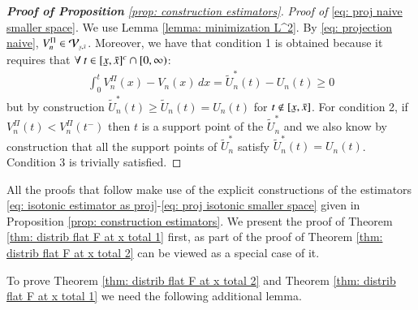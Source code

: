\begin{proof}[\hypertarget{proof of prop constructions}{\textbf{Proof of Proposition}} \ref{prop: construction estimators}]
    
    \textit{Proof of} \eqref{eq: proj naive smaller space}.  We use Lemma \ref{lemma: minimization L^2}. By \eqref{eq: projection naive}, $V^{\Pi}_n \in \mathcal{V}_{\scriptscriptstyle{\ubar{x},\bar{x}}}$. Moreover, we have that condition 1 is obtained because it requires that  $\forall \: t \in [\ubar{x},\bar{x}]^c \cap [0,\infty)$:
    \begin{align*}
        \int_{0}^{t} V^{\Pi}_n (x) - V_n(x) \, dx = \widetilde{U}^*_n (t) - U_n(t) \geq 0
    \end{align*}
    but by construction $\widetilde{U}_n^*(t)\geq \widetilde{U}_n(t) = U_n(t)$ for $t \notin [\ubar{x},\bar{x}]$. For condition 2, if $ V^{\Pi}_n(t) <  V^{\Pi}_n(t^{-})$ then $t$ is a support point of the $\widetilde{U}^*_n$ and we also know by construction that all the support points of $\widetilde{U}^*_n$ satisfy $\widetilde{U}^*_n(t) = U_n(t)$. Condition 3 is trivially satisfied.
\end{proof}


All the proofs that follow make use of the explicit constructions of the estimators \eqref{eq: isotonic estimator as proj}-\eqref{eq: proj isotonic smaller space} given in Proposition \ref{prop: construction estimators}. We present the proof of Theorem \ref{thm: distrib flat F at x total 1} first, as part of the proof of Theorem \ref{thm: distrib flat F at x total 2} can be viewed as a special case of it.

To prove Theorem \ref{thm: distrib flat F at x total 2} and Theorem  \ref{thm: distrib flat F at x total 1} we need the following additional lemma.

